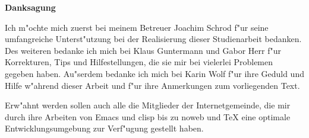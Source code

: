 

\mbox{}
\vfill

\noindent\textbf{Danksagung}

\bigskip

\noindent Ich m"ochte mich zuerst bei meinem Betreuer Joachim Schrod
f"ur seine umfangreiche Unterst"utzung bei der Realisierung dieser
Studienarbeit bedanken. Des weiteren bedanke ich mich bei Klaus
Guntermann und Gabor Herr f"ur Korrekturen, Tips und Hilfestellungen,
die sie mir bei vielerlei Problemen gegeben haben. Au"serdem bedanke
ich mich bei Karin Wolf f"ur ihre Geduld und Hilfe w"ahrend dieser
Arbeit und f"ur ihre Anmerkungen zum vorliegenden Text.

\bigskip\noindent Erw"ahnt werden sollen auch alle die Mitglieder der
Internetgemeinde, die mir durch ihre Arbeiten von \textsf{Emacs} und
\textsf{clisp} bis zu \textsf{noweb} und \TeX{} eine optimale
Entwicklungsumgebung zur Verf"ugung gestellt haben.


